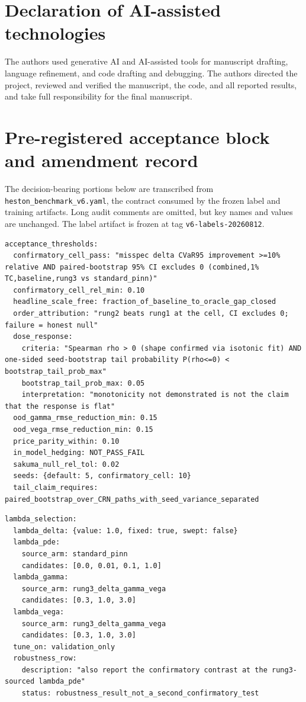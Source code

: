 \documentclass{article}
\begin{document}
\section*{Declaration of AI-assisted technologies}
The authors used generative AI and AI-assisted tools for manuscript drafting,
language refinement, and code drafting and debugging. The authors directed the
project, reviewed and verified the manuscript, the code, and all reported results,
and take full responsibility for the final manuscript.



\appendix
\section{Pre-registered acceptance block and amendment record}
\label{app:thresholds}
The decision-bearing portions below are transcribed from
\texttt{heston\_benchmark\_v6.yaml}, the contract consumed by the frozen label and
training artifacts. Long audit comments are omitted, but key names and values are
unchanged. The label artifact is frozen at tag
\texttt{v6-labels-20260812}.

\begin{lstlisting}[basicstyle=\ttfamily\tiny,breaklines=true,
  breakatwhitespace=true,keepspaces=true,columns=fullflexible]
acceptance_thresholds:
  confirmatory_cell_pass: "misspec delta CVaR95 improvement >=10% relative AND paired-bootstrap 95% CI excludes 0 (combined,1% TC,baseline,rung3 vs standard_pinn)"
  confirmatory_cell_rel_min: 0.10
  headline_scale_free: fraction_of_baseline_to_oracle_gap_closed
  order_attribution: "rung2 beats rung1 at the cell, CI excludes 0; failure = honest null"
  dose_response:
    criteria: "Spearman rho > 0 (shape confirmed via isotonic fit) AND one-sided seed-bootstrap tail probability P(rho<=0) < bootstrap_tail_prob_max"
    bootstrap_tail_prob_max: 0.05
    interpretation: "monotonicity not demonstrated is not the claim that the response is flat"
  ood_gamma_rmse_reduction_min: 0.15
  ood_vega_rmse_reduction_min: 0.15
  price_parity_within: 0.10
  in_model_hedging: NOT_PASS_FAIL
  sakuma_null_rel_tol: 0.02
  seeds: {default: 5, confirmatory_cell: 10}
  tail_claim_requires: paired_bootstrap_over_CRN_paths_with_seed_variance_separated
\end{lstlisting}

\begin{lstlisting}[basicstyle=\ttfamily\tiny,breaklines=true,
  breakatwhitespace=true,keepspaces=true,columns=fullflexible]
lambda_selection:
  lambda_delta: {value: 1.0, fixed: true, swept: false}
  lambda_pde:
    source_arm: standard_pinn
    candidates: [0.0, 0.01, 0.1, 1.0]
  lambda_gamma:
    source_arm: rung3_delta_gamma_vega
    candidates: [0.3, 1.0, 3.0]
  lambda_vega:
    source_arm: rung3_delta_gamma_vega
    candidates: [0.3, 1.0, 3.0]
  tune_on: validation_only
  robustness_row:
    description: "also report the confirmatory contrast at the rung3-sourced lambda_pde"
    status: robustness_result_not_a_second_confirmatory_test
\end{lstlisting}
\end{document}
